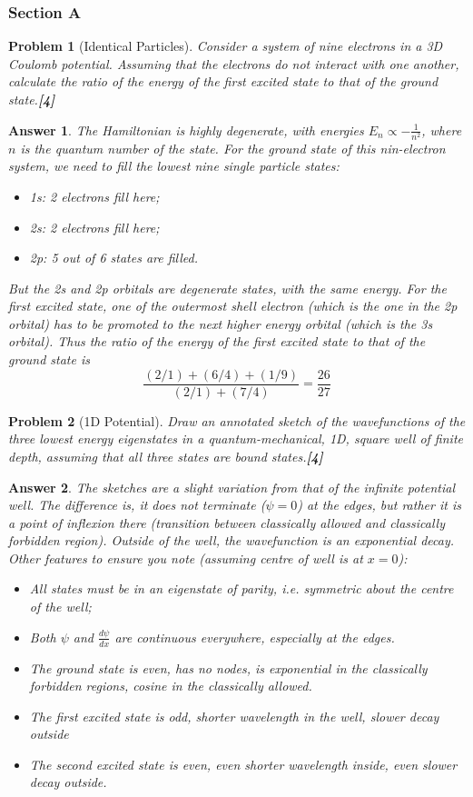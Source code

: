 \documentclass[a4paper]{article}
\newtheorem{ans}{Answer}[subsection]
\theoremstyle{new}
\newtheorem{qns}{Problem}[subsection]
\begin{document}
\subsubsection{Section A}
\begin{qns}[Identical Particles]
Consider a system of nine electrons in a 3D Coulomb potential. Assuming that the electrons do not interact with one another, calculate the ratio of the energy of the first excited state to that of the ground state.\hfill\textbf{[4]}
\end{qns}
\begin{ans}
The Hamiltonian is highly degenerate, with energies $E_n\propto -\frac{1}{n^2}$, where $n$ is the quantum number of the state. For the ground state of this nin-electron system, we need to fill the lowest nine single particle states:
\begin{itemize}
    \item 1s: 2 electrons fill here;
    \item 2s: 2 electrons fill here;
    \item 2p: 5 out of 6 states are filled.
\end{itemize}
But the 2s and 2p orbitals are degenerate states, with the same energy. For the first excited state, one of the outermost shell electron (which is the one in the 2p orbital) has to be promoted to the next higher energy orbital (which is the 3s orbital). Thus the ratio of the energy of the first excited state to that of the ground state is
$$\frac{(2/1)+(6/4)+(1/9)}{(2/1)+(7/4)}=\frac{26}{27}$$
\end{ans}
\begin{qns}[1D Potential]
Draw an annotated sketch of the wavefunctions of the three lowest energy eigenstates in a quantum-mechanical, 1D, square well of finite depth, assuming that all three states are bound states.\hfill\textbf{[4]}
\end{qns}
\begin{ans}
The sketches are a slight variation from that of the infinite potential well. The difference is, it does not terminate ($\psi=0$) at the edges, but rather it is a point of inflexion there (transition between classically allowed and classically forbidden region). Outside of the well, the wavefunction is an exponential decay. Other features to ensure you note (assuming centre of well is at $x = 0$):
\begin{itemize}
    \item All states must be in an eigenstate of parity, i.e. symmetric about the centre of the well;
    \item Both $\psi$ and $\frac{d\psi}{dx}$ are continuous everywhere, especially at the edges.
    \item The ground state is even, has no nodes, is exponential in the classically forbidden regions, cosine in the classically allowed.
    \item The first excited state is odd, shorter wavelength in the well, slower decay outside
    \item The second excited state is even, even shorter wavelength inside, even slower decay outside.
\end{itemize}
\end{ans}
\end{document}
